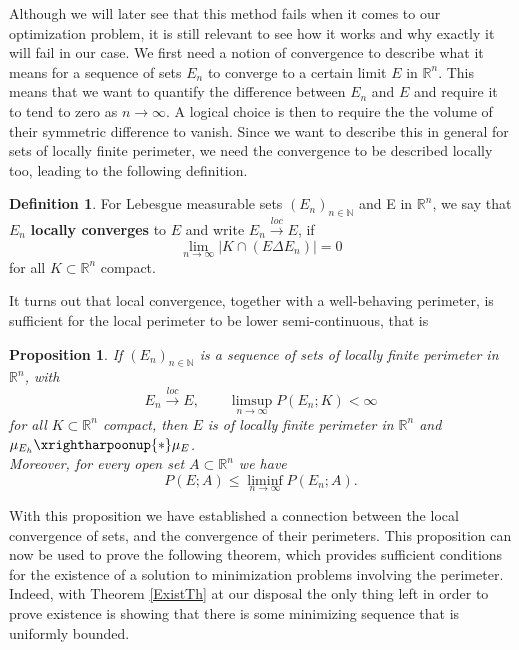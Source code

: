\documentclass[artcle, 11pt, reqno]{amsart}
\numberwithin{equation}{section}
\newcommand{\R}{\mathbb{R}}
\newcommand{\N}{\mathbb{N}}
\newcommand{\ninfty}{n \rightarrow \infty}
\theoremstyle{plain}
\newtheorem{proposition}[theorem]{Proposition}
\theoremstyle{definition}
\newtheorem{definition}[theorem]{Definition}
\theoremstyle{remark}
\begin{document}
	Although we will later see that this method fails when it comes to our optimization problem, it is still relevant to see how it works and why exactly it will fail in our case. We first need a notion of convergence to describe what it means for a sequence of sets $E_n$ to converge to a certain limit $E$ in $\R^n$. This means that we want to quantify the difference between $E_n$ and $E$ and require it to tend to zero as $n \rightarrow\infty$. A logical choice is then to require the the volume of their symmetric difference to vanish. Since we want to describe this in general for sets of locally finite perimeter, we need the convergence to be described locally too, leading to the following definition.
	\begin{definition}
		For Lebesgue measurable sets $(E_n)_{n \in \N}$ and E in $\R^n$, we say that $E_n$ \textbf{locally converges} to $E$ and write $E_n \xrightarrow{loc} E$, if
		\[
		\lim_{n \rightarrow\infty} |K \cap (E \Delta E_n)| = 0 
		\]
		for all $K \subset \R^n$ compact. 
	\end{definition}
	It turns out that local convergence, together with a well-behaving perimeter, is sufficient for the local perimeter to be lower semi-continuous, that is
	\begin{proposition} \label{lscProp}
		If $(E_n)_{n \in \N}$ is a sequence of sets of locally finite perimeter in $\R^n$, with
		\begin{equation} \label{limsupcpt}
			E_n \xrightarrow{loc} E, \qquad \limsup_{n \rightarrow\infty} P(E_n; K) < \infty
		\end{equation}
		for all $K \subset \R^n$ compact, then $E$ is of locally finite perimeter in $\R^n$ and $\mu_{E_h} \xrightharpoonup{\ast} \mu_E$.\\ Moreover, for every open set $A \subset \R^n$ we have 
		\[
		P(E;A) \leq \liminf_{\ninfty} P(E_n;A).
		\]
	\end{proposition}
	With this proposition  we have established a connection between the local convergence of sets, and the convergence of their perimeters. 
	This proposition can now be used to prove the following theorem, which provides sufficient conditions for the existence of a solution to minimization problems involving the perimeter.
	Indeed, with Theorem \ref{ExistTh} at our disposal the only thing left in order to prove existence is showing that there is some minimizing sequence that is uniformly bounded.
	
\end{document}
